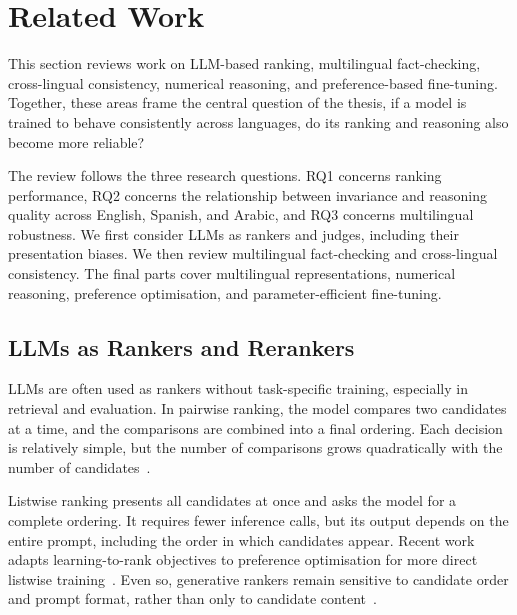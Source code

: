 
\section{Related Work}
\label{sec:related-work}

This section reviews work on LLM-based ranking, multilingual fact-checking,
cross-lingual consistency, numerical reasoning, and preference-based fine-tuning.
Together, these areas frame the central question of the thesis, if a model is
trained to behave consistently across languages, do its ranking and reasoning
also become more reliable?

The review follows the three research questions. RQ1 concerns ranking performance,
RQ2 concerns the relationship between invariance and reasoning quality across
English, Spanish, and Arabic, and RQ3 concerns multilingual robustness. We first
consider LLMs as rankers and judges, including their presentation biases. We then
review multilingual fact-checking and cross-lingual consistency. The final parts
cover multilingual representations, numerical reasoning, preference optimisation,
and parameter-efficient fine-tuning.

\subsection{LLMs as Rankers and Rerankers}
\label{subsec:ranking}

LLMs are often used as rankers without task-specific training, especially in
retrieval and evaluation. In pairwise ranking, the model compares two candidates
at a time, and the comparisons are combined into a final ordering. Each decision
is relatively simple, but the number of comparisons grows quadratically with the
number of candidates~\cite{qin2024largelanguagemodelseffective}.

Listwise ranking presents all candidates at once and asks the model for a complete
ordering. It requires fewer inference calls, but its output depends on the entire
prompt, including the order in which candidates appear. Recent work adapts
learning-to-rank objectives to preference optimisation for more direct listwise
training~\cite{liu-etal-2025-lipo}. Even so, generative rankers remain sensitive
to candidate order and prompt format, rather than only to candidate
content~\cite{qiao2026llmbasedlistwisererankingeffect}.

